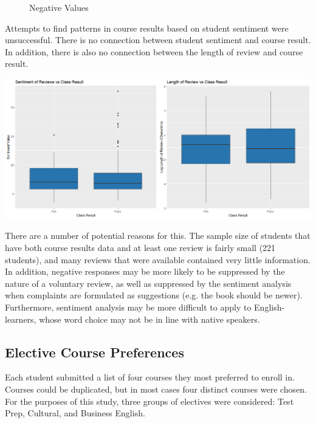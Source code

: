 \documentclass[12pt,letterpaper]{article}
\begin{document}
\begin{figure}[!bp]
\begin{minipage}[b]{0.4\textwidth}
    \caption{Negative Values}
  \end{minipage}
\end{figure}

\newpage

Attempts to find patterns in course results based on student sentiment were unsuccessful. There is no connection between student sentiment and course result. In addition, there is also no connection between the length of review and course result.

\begin{center}
    \includegraphics[width = \textwidth]{Plots/sentiment_boxes.png}
\end{center}

There are a number of potential reasons for this. The sample size of students that have both course results data and at least one review is fairly small (221 students), and many reviews that were available contained very little information. In addition, negative responses may be more likely to be suppressed by the nature of a voluntary review, as well as suppressed by the sentiment analysis when complaints are formulated as suggestions (e.g. the book should be newer). Furthermore, sentiment analysis may be more difficult to apply to English-learners, whose word choice may not be in line with native speakers.


\subsection{Elective Course Preferences}

Each student submitted a list of four courses they most preferred to enroll in. Courses could be duplicated, but in most cases four distinct courses were chosen. For the purposes of this study, three groups of electives were considered: Test Prep, Cultural, and Business English.
\end{document}
